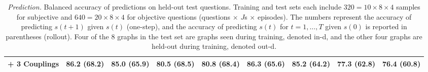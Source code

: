 \begin{table}[t]
\begin{adjustbox}{max width=\textwidth}
\begin{tabular}{l cc cc cc cc}
\quad + 3 Couplings & \textbf{86.2 (68.2)} & \textbf{85.0 (65.9)} & \textbf{80.5 (68.5)} & \textbf{80.8 (68.4)} & \textbf{86.3 (65.6)} & \textbf{85.2 (64.2)} & \textbf{77.3 (62.8)} & \textbf{76.4 (60.8)} \\
\bottomrule
\end{tabular}
\end{adjustbox}
\caption{\textit{Prediction.} Balanced accuracy of predictions on held-out test questions. Training and test sets each include $320= 10 \times 8 \times 4$ samples for subjective and  $640 = 20 \times 8 \times 4$ for objective questions (questions $\times$ $J$s $\times$ episodes). The numbers represent the accuracy of predicting $s(t+1)$ given $s(t)$ (one-step), and the accuracy of predicting $s(t)$ for $t=1,\dots , T$ given $s(0)$ is reported in parentheses (rollout). Four of the 8 graphs in the test set are graphs seen during training, denoted in-d, and the other four graphs are held-out during training, denoted out-d. 
\label{tab:prediction_models}}
\end{table}

